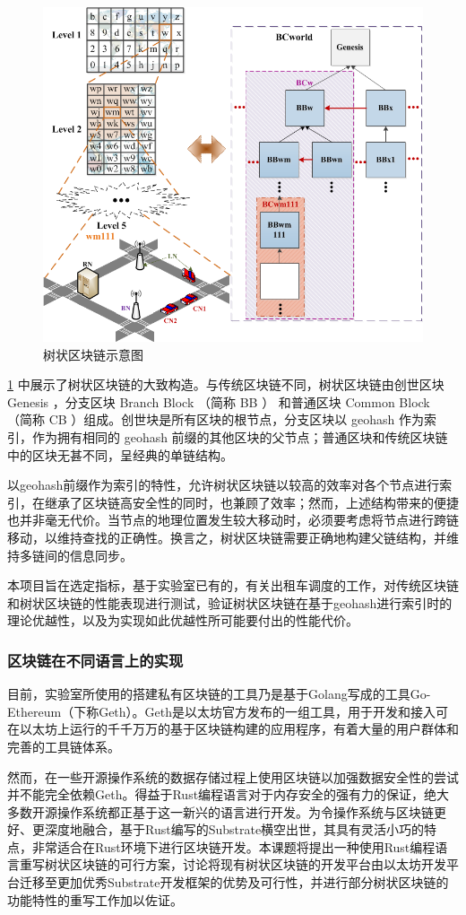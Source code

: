\documentclass[type=undergraduate_proposal]{bitreport}
\begin{document}
\begin{figure}[!ht]
  \centering
  \includegraphics[width=0.6\linewidth]{misc/tree-like-blockchain.png}
  \caption{树状区块链示意图}
  \label{fig:tree-like-blockchain}
\end{figure}

\ref{fig:tree-like-blockchain} 中展示了树状区块链的大致构造。与传统区块链不同，树状区块链由创世区块 Genesis ，分支区块 Branch Block （简称 BB ） 和普通区块 Common Block （简称 CB ）组成。创世块是所有区块的根节点，分支区块以 geohash 作为索引，作为拥有相同的 geohash 前缀的其他区块的父节点；普通区块和传统区块链中的区块无甚不同，呈经典的单链结构。

以geohash前缀作为索引的特性，允许树状区块链以较高的效率对各个节点进行索引，在继承了区块链高安全性的同时，也兼顾了效率；然而，上述结构带来的便捷也并非毫无代价。当节点的地理位置发生较大移动时，必须要考虑将节点进行跨链移动，以维持查找的正确性。换言之，树状区块链需要正确地构建父链结构，并维持多链间的信息同步。

本项目旨在选定指标，基于实验室已有的，有关出租车调度的工作，对传统区块链和树状区块链的性能表现进行测试，验证树状区块链在基于geohash进行索引时的理论优越性，以及为实现如此优越性所可能要付出的性能代价。

\subsubsection{区块链在不同语言上的实现}
目前，实验室所使用的搭建私有区块链的工具乃是基于Golang写成的工具Go-Ethereum\cite{about_geth}（下称Geth）。Geth是以太坊官方发布的一组工具，用于开发和接入可在以太坊上运行的千千万万的基于区块链构建的应用程序，有着大量的用户群体和完善的工具链体系。

然而，在一些开源操作系统的数据存储过程上使用区块链以加强数据安全性的尝试并不能完全依赖Geth。得益于Rust编程语言对于内存安全的强有力的保证\cite{system_programming}，绝大多数开源操作系统都正基于这一新兴的语言进行开发。为令操作系统与区块链更好、更深度地融合，基于Rust编写的Substrate横空出世\cite{about_substrate}，其具有灵活小巧的特点，非常适合在Rust环境下进行区块链开发。本课题将提出一种使用Rust编程语言重写树状区块链的可行方案，讨论将现有树状区块链的开发平台由以太坊开发平台迁移至更加优秀Substrate开发框架的优势及可行性，并进行部分树状区块链的功能特性的重写工作加以佐证。
\end{document}
